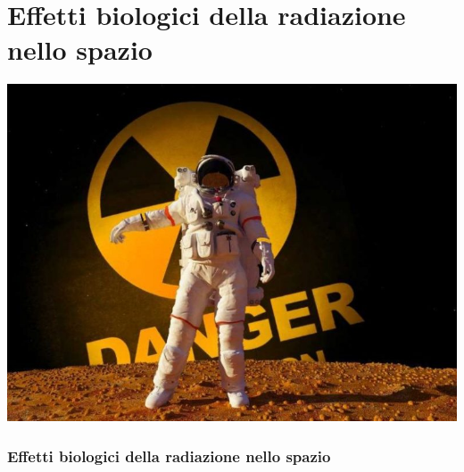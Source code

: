 \documentclass[9pt]{beamer}
\begin{document}
\section{Effetti biologici della radiazione nello spazio}
{\usebackgroundtemplate 
{\includegraphics[width=\paperwidth]{figures/fig0.jpg}}
\begin{frame} [fragile]
	\frametitle{Effetti biologici della radiazione nello spazio}

\end{frame}
}
	
\end{document}

